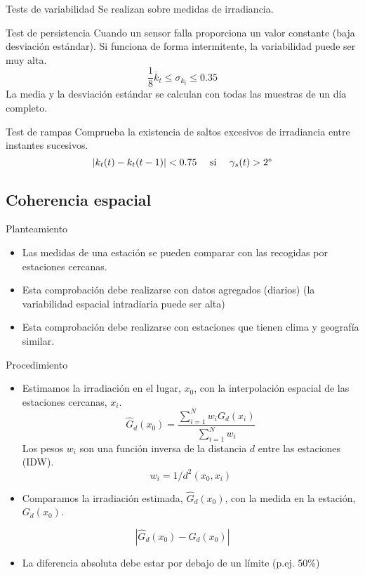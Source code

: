 \documentclass[aspectratio=169, usenames,svgnames,dvipsnames]{beamer}
\begin{document}
\begin{frame}[label={sec:orgc63da5e}]{Tests de variabilidad}
Se realizan sobre medidas de irradiancia.

\begin{block}{Test de persistencia}
Cuando un sensor falla proporciona un valor constante (baja desviación estándar). Si funciona de forma intermitente, la variabilidad puede ser muy alta.
\[
\frac{1}{8} \overline{k}_t \leq \sigma_{k_t} \leq 0.35
\]
La media y la desviación estándar se calculan con todas las muestras de un día completo.
\end{block}

\begin{block}{Test de rampas}
Comprueba la existencia de saltos excesivos de irradiancia entre instantes sucesivos.
\[
\left| k_t(t) - k_t(t-1)\right| < 0.75 \quad \text{ si } \quad \gamma_s(t) > 2\degree
\]
\end{block}
\end{frame}

\subsection{Coherencia espacial}
\label{sec:orgc8b55ae}
\begin{frame}[label={sec:org7d21848}]{Planteamiento}
\begin{itemize}
\item Las medidas de una estación se pueden comparar con las recogidas por estaciones cercanas.
\item Esta comprobación debe realizarse con \alert{datos agregados} (diarios) (la variabilidad espacial intradiaria puede ser alta)
\item Esta comprobación debe realizarse con estaciones que tienen \alert{clima y geografía similar}.
\end{itemize}

\nocite{Journee.Bertrand2011}
\end{frame}

\begin{frame}[label={sec:org4c60649}]{Procedimiento}
\begin{itemize}
\item Estimamos la irradiación en el lugar, \(x_0\), con la interpolación espacial de las estaciones cercanas, \(x_i\).
\[
\widehat{G}_d(x_0) = \frac{\sum_{i=1}^N w_i G_{d}(x_i)}{\sum_{i=1}^N w_i} 
\]
Los pesos \(w_i\) son una función inversa de la distancia \(d\) entre las estaciones (IDW).
\[
  w_i = 1/d^2(x_0, x_i)
\]

\item Comparamos la irradiación estimada, \(\widehat{G}_d(x_0)\), con la medida en la estación, \(G_d(x_0)\).
\end{itemize}
\[
\left| \widehat{G}_d(x_0) - G_d(x_0) \right|
\]
\begin{itemize}
\item La diferencia absoluta debe estar por debajo de un límite (p.ej. 50\%)
\end{itemize}
\end{frame}
\end{document}
